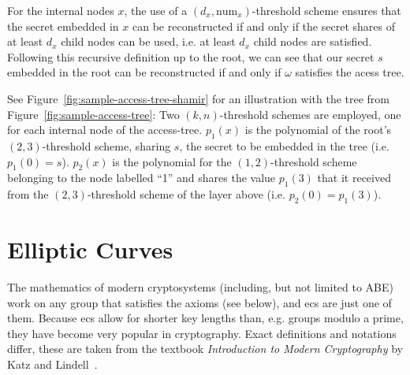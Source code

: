 For the internal nodes $x$, the use of a $(d_x, \text{num}_x)$-threshold scheme ensures that the secret embedded in $x$ can be reconstructed if and only if the secret shares of at least $d_x$ child nodes can be used, i.e. at least $d_x$ child nodes are satisfied.
Following this recursive definition up to the root, we can see that our secret $s$ embedded in the root can be reconstructed if and only if $\omega$ satisfies the acess tree.

See Figure~\ref{fig:sample-access-tree-shamir} for an illustration with the tree from Figure~\ref{fig:sample-access-tree}:
Two $(k,n)$-threshold schemes are employed, one for each internal node of the \gls{access-tree}.
$p_1(x)$ is the polynomial of the root's $(2,3)$-threshold scheme, sharing $s$, the secret to be embedded in the tree (i.e. $p_1(0) = s$).
$p_2(x)$ is the polynomial for the $(1,2)$-threshold scheme belonging to the node labelled ``1'' and shares the value $p_1(3)$ that it received from the $(2,3)$-threshold scheme of the layer above (i.e. $p_2(0) = p_1(3)$).

\section{Elliptic Curves}
\label{sec:ec}

The mathematics of modern cryptosystems (including, but not limited to ABE) work on any group that satisfies the axioms (see below), and \glspl{ec} are just one of them.
Because \Glspl{ec} allow for shorter key lengths than, e.g. groups modulo a prime, they have become very popular in cryptography.
Exact definitions and notations differ, these are taken from the textbook \emph{Introduction to Modern Cryptography} by Katz and Lindell~\cite{katz_introduction_2015}.

